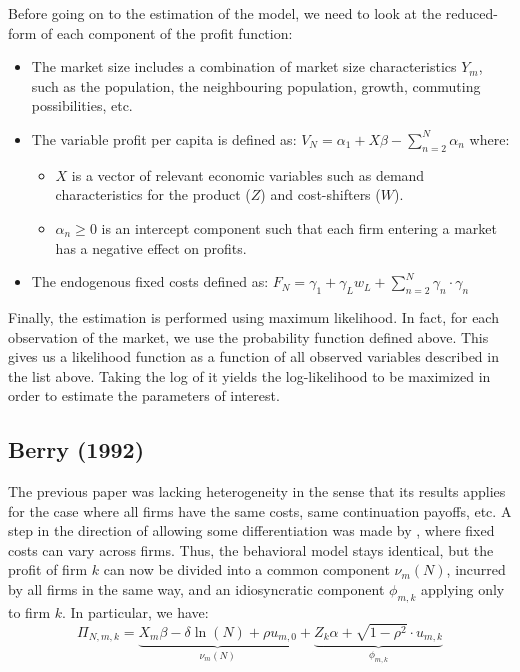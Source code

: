 Before going on to the estimation of the model, we need to look at the reduced-form of each component of the profit function:\begin{itemize}
\item The market size includes a combination of market size characteristics $Y_m$, such as the population, the neighbouring population, growth, commuting possibilities, etc.
\item The variable profit per capita is defined as: $V_N = \alpha_1 + X\beta - \sum_{n=2}^{N} \alpha_n $ where:\begin{itemize}
\item $X$ is a vector of relevant economic variables such as demand characteristics for the product ($Z$) and cost-shifters ($W$).
\item $\alpha_n\geq 0$ is an intercept component such that each firm entering a market has a negative effect on profits. 
\end{itemize}
\item The endogenous fixed costs defined as: $F_N = \gamma_1 + \gamma_Lw_L + \sum_{n=2}^{N}\gamma_n\cdot\gamma_n $ 
\end{itemize}

Finally, the estimation is performed using maximum likelihood. In fact, for each observation of the market, we use the probability function defined above. This gives us a likelihood function as a function of all observed variables described in the list above. Taking the log of it yields the log-likelihood to be maximized in order to estimate the parameters of interest.

\subsection{Berry (1992)}

The previous paper was lacking heterogeneity in the sense that its results applies for the case where all firms have the same costs, same continuation payoffs, etc. A step in the direction of allowing some differentiation was made by \cite{berry_92}, where fixed costs can vary across firms. Thus, the behavioral model stays identical, but the profit of firm $k$ can now be divided into a common component $\nu_m(N)$, incurred by all firms in the same way, and an idiosyncratic component $\phi_{m,k}$ applying only to firm $k$. In particular, we have: $$ \Pi_{N,m,k} = \underbrace{X_m\beta - \delta\ln(N) + \rho u_{m,0}}_{\nu_m(N)} + \underbrace{Z_k\alpha + \sqrt{1 - \rho^2}\cdot u_{m,k}}_{\phi_{m,k}} $$ 

